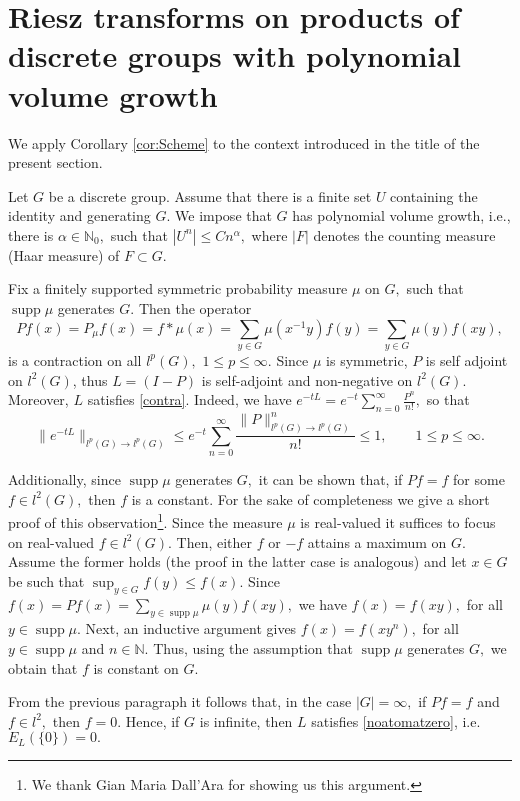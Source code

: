 \documentclass[leqno,12pt]{amsart}
\theoremstyle{definition}
\theoremstyle{remark}
\begin{document}
\section[Riesz transforms on products of discrete groups]{Riesz transforms on products of discrete groups with polynomial volume growth}
\label{sec:disc}
We apply Corollary \ref{cor:Scheme} to the context introduced in the title of the present section.

Let $G$ be a discrete group. Assume that there is a finite set $U$ containing the identity and generating $G.$ We impose that $G$ has polynomial volume growth, i.e., there is $\alpha\in \mathbb{N}_0,$ such that
$
|U^n|\leq C n^{\alpha},
$ where $|F|$ denotes the counting measure (Haar measure) of $F\subset G.$

Fix a finitely supported symmetric probability measure $\mu$ on $G,$ such that $\operatorname{supp} \mu$ generates $G.$ Then the operator $$P f(x)=P_{\mu} f(x)=f*\mu(x)=\sum_{y\in G}\mu(x^{-1}y) f(y)=\sum_{y\in G}\mu(y) f(xy),$$
is a contraction on all $l^p(G),$ $1\leq p\leq \infty.$ Since $\mu$ is symmetric, $P$ is self adjoint on $l^2(G)$, thus $L=(I-P)$ is self-adjoint and non-negative on $l^2(G).$ Moreover, $L$ satisfies \eqref{contra}. Indeed, we have
$e^{-tL}=e^{-t}\sum_{n=0}^{\infty}\frac{P^n }{n!},$ so that
$$\|e^{-tL}\|_{l^p(G)\to l^p(G)}\leq e^{-t}\sum_{n=0}^{\infty}\frac{\|P\|^n_{l^p(G)\to l^p(G)}}{n!}\leq 1, \qquad 1\leq p\leq \infty.$$

Additionally, since $\operatorname{supp} \mu$ generates $G,$ it can be shown that, if $Pf=f$ for some $f\in l^2(G),$ then $f$ is a constant. For the sake of completeness we give a short proof of this observation\footnote{We thank Gian Maria Dall'Ara for showing us this argument.}. Since the measure $\mu$ is real-valued it suffices to focus on real-valued $f\in l^2(G).$ Then, either $f$ or $-f$ attains a maximum on $G.$ Assume the former holds (the proof in the latter case is analogous) and let $x\in G$ be such that $\sup_{y\in G}f(y)\leq f(x).$ Since $f(x)=Pf(x)=\sum_{y\in \operatorname{supp} \mu}\mu(y)f(xy),$ we have $f(x)=f(xy),$ for all $y\in \operatorname{supp} \mu.$ Next, an inductive argument gives $f(x)=f(xy^n),$ for all $y\in \operatorname{supp} \mu$ and $n\in \mathbb{N}.$ Thus, using the assumption that $\operatorname{supp} \mu$ generates $G,$ we obtain that $f$ is constant on $G.$

From the previous paragraph it follows that, in the case $|G|=\infty,$ if $Pf=f$ and $f\in l^2,$ then $f=0.$ Hence, if $G$ is infinite, then $L$ satisfies \eqref{noatomatzero}, i.e.\ $E_{L}(\{0\})=0.$
\end{document}
